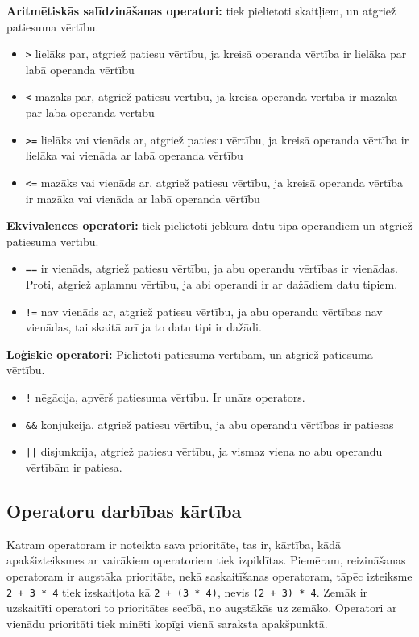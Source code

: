 \documentclass[12pt,a4paper]{report}
\begin{document}
\textbf{Aritmētiskās salīdzināšanas operatori:} tiek pielietoti skaitļiem, un atgriež patiesuma vērtību. 
\begin{itemize}
  \item \texttt{>} lielāks par, atgriež patiesu vērtību, ja kreisā operanda vērtība ir lielāka par labā operanda vērtību
  \item \texttt{<} mazāks par, atgriež patiesu vērtību, ja kreisā operanda vērtība ir mazāka par labā operanda vērtību
  \item \texttt{>=} lielāks vai vienāds ar, atgriež patiesu vērtību, ja kreisā operanda vērtība ir lielāka vai vienāda ar labā operanda vērtību
  \item \texttt{<=} mazāks vai vienāds ar, atgriež patiesu vērtību, ja kreisā operanda vērtība ir mazāka vai vienāda ar labā operanda vērtību
\end{itemize}

\textbf{Ekvivalences operatori:} tiek pielietoti jebkura datu tipa operandiem un atgriež patiesuma vērtību. 
\begin{itemize}
  \item \texttt{==} ir vienāds, atgriež patiesu vērtību, ja abu operandu vērtības ir vienādas. Proti, atgriež aplamnu vērtību, ja abi operandi ir ar dažādiem datu tipiem.
  \item \texttt{!=} nav vienāds ar, atgriež patiesu vērtību, ja abu operandu vērtības nav vienādas, tai skaitā arī ja to datu tipi ir dažādi.
\end{itemize}

\textbf{Loģiskie operatori:} Pielietoti patiesuma vērtībām, un atgriež patiesuma vērtību.
\begin{itemize}
  \item \texttt{!} nēgācija, apvērš patiesuma vērtību. Ir unārs operators. 
  \item \texttt{\&\&} konjukcija, atgriež patiesu vērtību, ja abu operandu vērtības ir patiesas
  \item \texttt{||} disjunkcija, atgriež patiesu vērtību, ja vismaz viena no abu operandu vērtībām ir patiesa.
\end{itemize}

\subsection{Operatoru darbības kārtība}

Katram operatoram ir noteikta sava prioritāte, tas ir, kārtība, kādā apakšizteiksmes ar vairākiem operatoriem tiek izpildītas. Piemēram, reizināšanas operatoram ir augstāka prioritāte, nekā saskaitīšanas operatoram, tāpēc izteiksme \texttt{2 + 3 * 4} tiek izskaitļota kā \texttt{2 + (3 * 4)}, nevis \texttt{(2 + 3) * 4}. 
Zemāk ir uzskaitīti operatori to prioritātes secībā, no augstākās uz zemāko. Operatori ar vienādu prioritāti tiek minēti kopīgi vienā saraksta apakšpunktā.
\end{document}
